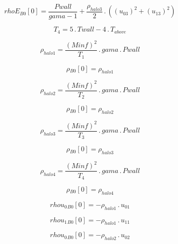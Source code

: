 \documentclass{article}
\begin{document}
\begin{dmath}{rhoE{_{B0}}}[{0}] = \frac{Pwall}{gama - 1} + \frac{\rho_{halo 3}}{2} \,.\, \left(\left(u_{03} \right)^{2} + \left(u_{13} \right)^{2}\right)\end{dmath}

\begin{dmath}T_{4} = 5 \,.\, Twall - 4 \,.\, T_{above}\end{dmath}

\begin{dmath}\rho_{halo 1} = \frac{\left(Minf \right)^{2}}{T_{1}} \,.\, gama \,.\, Pwall\end{dmath}

\begin{dmath}{\rho{_{B0}}}[{0}] = \rho_{halo 1}\end{dmath}

\begin{dmath}\rho_{halo 2} = \frac{\left(Minf \right)^{2}}{T_{2}} \,.\, gama \,.\, Pwall\end{dmath}

\begin{dmath}{\rho{_{B0}}}[{0}] = \rho_{halo 2}\end{dmath}

\begin{dmath}\rho_{halo 3} = \frac{\left(Minf \right)^{2}}{T_{3}} \,.\, gama \,.\, Pwall\end{dmath}

\begin{dmath}{\rho{_{B0}}}[{0}] = \rho_{halo 3}\end{dmath}

\begin{dmath}\rho_{halo 4} = \frac{\left(Minf \right)^{2}}{T_{4}} \,.\, gama \,.\, Pwall\end{dmath}

\begin{dmath}{\rho{_{B0}}}[{0}] = \rho_{halo 4}\end{dmath}

\begin{dmath}{rhou_{0}{_{B0}}}[{0}] = - \rho_{halo 1} \,.\, u_{01}\end{dmath}

\begin{dmath}{rhou_{1}{_{B0}}}[{0}] = - \rho_{halo 1} \,.\, u_{11}\end{dmath}

\begin{dmath}{rhou_{0}{_{B0}}}[{0}] = - \rho_{halo 2} \,.\, u_{02}\end{dmath}
\end{document}
